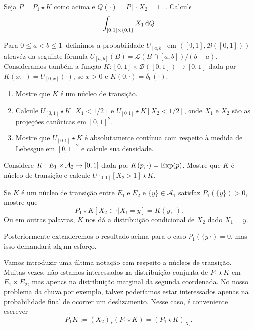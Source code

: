 \begin{exercise}
  Seja $P = P_1 \star K$ como acima e $Q(\cdot) = P[\cdot | X_2 = 1]$.
  Calcule
  \begin{equation}
    \int_{[0,1] \times \{0,1\}} X_1 \mathop{}\!\mathrm{d} Q
  \end{equation}
\end{exercise}

\begin{exercise}
  Para $0 \leq a < b \leq 1$, definimos a probabilidade $U_{[a,b]}$ em $([0,1], \mathcal{B}([0,1]))$ atravéz da seguinte fórmula $U_{[a,b]}(B) = \mathcal{L}(B \cap [a,b])/(b-a)$.
  Consideramos também a função $K:[0,1] \times \mathcal{B}([0,1]) \to [0,1]$ dada por $K(x, \cdot) = U_{[0,x]} (\cdot)$, se $x > 0$ e $K(0, \cdot) = \delta_0(\cdot)$.
  \begin{enumerate}[\quad a)]
  \item Mostre que $K$ é um núcleo de transição.
  \item Calcule $U_{[0,1]} \star K [X_1 < 1/2]$ e $U_{[0,1]} \star K [X_2 < 1/2]$, onde $X_1$ e $X_2$ são as projeções canônicas em $[0,1]^2$.
  \item Mostre que $U_{[0,1]} \star K$ é absolutamente contínua com respeito à medida de Lebesgue em $[0,1]^2$ e calcule sua densidade.
\end{enumerate}

\end{exercise}

\begin{exercise}
  Considere $K:E_1 \times {\ensuremath{\mathcal A}}_2 \to [0,1]$ dada por $K(p, \cdot) = \operatorname{Exp}(p)$.
  Mostre que $K$ é núcleo de transição e calcule $U_{[0,1]}[X_2 > 1] \star K$.
\end{exercise}

\begin{exercise}
  Se $K$ é um núcleo de transição entre $E_1$ e $E_2$ e $\{y\} \in \mathcal{A}_1$ satisfaz $P_1(\{y\}) > 0$, mostre que
  \begin{equation}
    P_1 \star K [X_2 \in \cdot | X_1 = y] = K(y, \cdot).
  \end{equation}
  Ou em outras palavras, $K$ nos dá a distribuição condicional de $X_2$ dado $X_1 = y$.
\end{exercise}

Posteriormente extenderemos o resultado acima para o caso $P_1(\{y\}) = 0$, mas isso demandará algum esforço.

Vamos introduzir uma última notação com respeito a núcleos de transição.
Muitas vezes, não estamos interessados na distribuição conjunta de $P_1 \star K$ em $E_1 \times E_2$, mas apenas na distribuição marginal da segunda coordenada.
No nosso problema da chuva por exemplo, talvez poderíamos estar interessados apenas na probabilidade final de ocorrer um deslizamento.
Nesse caso, é conveniente escrever
\begin{equation}
  \label{e:P1_K}
  P_1 K := (X_2)_*(P_1 \star K) = (P_1 \star K)_{X_2}.
\end{equation}

